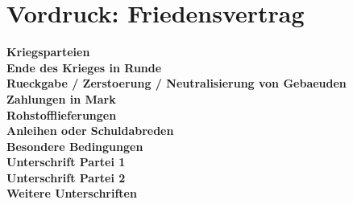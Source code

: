 \documentclass[11pt,a4paper,oneside,parskip=half]{scrreprt}
\newcommand{\formline}[1]{\textbf{#1}\enspace\hrulefill}
\begin{document}
\chapter{Vordruck: Friedensvertrag}

\begin{framed}
\noindent\formline{Kriegsparteien}\\[1.2em]
\formline{Ende des Krieges in Runde}\\[1.2em]
\formline{Rueckgabe / Zerstoerung / Neutralisierung von Gebaeuden}\\[2.2em]
\formline{Zahlungen in Mark}\\[1.2em]
\formline{Rohstofflieferungen}\\[1.2em]
\formline{Anleihen oder Schuldabreden}\\[1.2em]
\formline{Besondere Bedingungen}\\[2.2em]
\formline{Unterschrift Partei 1}\\[1.2em]
\formline{Unterschrift Partei 2}\\[1.2em]
\formline{Weitere Unterschriften}
\end{framed}
\end{document}
